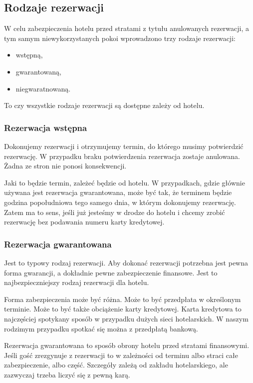 \documentclass[a4paper,onecolumn,oneside,11pt,wide,floatssmall]{mwrep}
\theoremstyle{definition}
\theoremstyle{plain}%
\theoremstyle{remark}
\begin{document}
\subsection{Rodzaje rezerwacji}
W celu zabezpieczenia hotelu przed stratami z tytułu anulowanych rezerwacji, 
a tym samym niewykorzystanych pokoi wprowadzono trzy rodzaje rezerwacji:

\begin{itemize}
  \item wstępną,
  \item gwarantowaną,
  \item niegwaratnowaną.
\end{itemize}

To czy wszystkie rodzaje rezerwacji są dostępne zależy od hotelu. 

\subsubsection{Rezerwacja wstępna}
Dokonujemy rezerwacji i otrzymujemy termin, do którego musimy potwierdzić 
rezerwację. W przypadku braku potwierdzenia rezerwacja zostaje anulowana. 
Żadna ze stron nie ponosi konsekwencji.

Jaki to będzie termin, zależeć będzie od hotelu. W przypadkach, gdzie 
głównie używana jest rezerwacja gwarantowana, może być tak, że terminem 
będzie godzina popołudniowa tego samego dnia, w którym dokonujemy rezerwację.
 Zatem ma to sens, jeśli już jesteśmy w drodze do hotelu i chcemy zrobić 
 rezerwację bez podawania numeru karty kredytowej.

\subsubsection{Rezerwacja gwarantowana}
Jest to typowy rodzaj rezerwacji. Aby dokonać rezerwacji potrzebna jest 
pewna forma gwarancji, a dokładnie pewne zabezpieczenie finansowe. Jest to 
najbezpieczniejszy rodzaj rezerwacji dla hotelu.

Forma zabezpieczenia może być różna. Może to być przedpłata w określonym 
terminie. Może to być także obciążenie karty kredytowej. Karta kredytowa to 
najczęściej spotykany sposób w przypadku dużych sieci hotelarskich. W naszym 
rodzimym przypadku spotkać się można z przedpłatą bankową.

Rezerwacja gwarantowana to sposób obrony hotelu przed stratami finansowymi. 
Jeśli gość zrezgynuje z rezerwacji to w zależności od terminu albo straci 
całe zabezpieczenie, albo część. Szczegóły zależą od zakładu hotelarskiego, 
ale zazwyczaj trzeba liczyć się z pewną karą.
\end{document}
